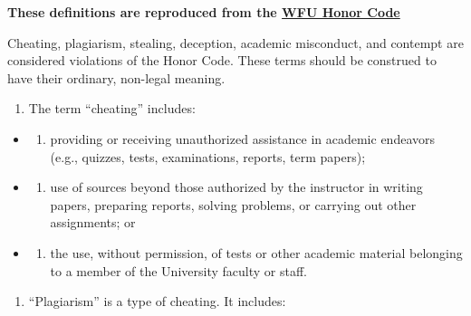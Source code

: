 \documentclass[
]{book}
\providecommand{\tightlist}{%
  \setlength{\itemsep}{0pt}\setlength{\parskip}{0pt}}
\begin{document}
\textbf{These definitions are reproduced from the \href{https://studentconduct.wfu.edu/procedures-of-the-honor-and-ethics-council/}{WFU Honor Code}}

Cheating, plagiarism, stealing, deception, academic misconduct, and contempt are considered violations of the Honor Code. These terms should be construed to have their ordinary, non-legal meaning.

\begin{enumerate}
\def\labelenumi{\arabic{enumi}.}
\tightlist
\item
  The term ``cheating'' includes:
\end{enumerate}

\begin{itemize}
\tightlist
\item
  \begin{enumerate}
  \def\labelenumi{(\alph{enumi})}
  \tightlist
  \item
    providing or receiving unauthorized assistance in academic endeavors (e.g., quizzes, tests, examinations, reports, term papers);
  \end{enumerate}
\item
  \begin{enumerate}
  \def\labelenumi{(\alph{enumi})}
  \setcounter{enumi}{1}
  \tightlist
  \item
    use of sources beyond those authorized by the instructor in writing papers, preparing reports, solving problems, or carrying out other assignments; or
  \end{enumerate}
\item
  \begin{enumerate}
  \def\labelenumi{(\alph{enumi})}
  \setcounter{enumi}{2}
  \tightlist
  \item
    the use, without permission, of tests or other academic material belonging to a member of the University faculty or staff.
  \end{enumerate}
\end{itemize}

\begin{enumerate}
\def\labelenumi{\arabic{enumi}.}
\setcounter{enumi}{1}
\tightlist
\item
  ``Plagiarism'' is a type of cheating. It includes:
\end{enumerate}
\end{document}
